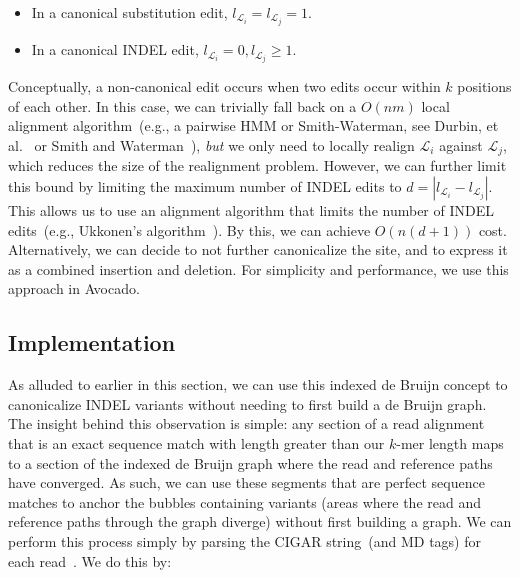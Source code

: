 \documentclass[phd]{ucbthesis}
\begin{document}
\begin{itemize}
\item In a canonical substitution edit, $l_{\mathcal{L}_i} = l_{\mathcal{L}_j} = 1$.
\item In a canonical INDEL edit, $l_{\mathcal{L}_i} = 0, l_{\mathcal{L}_j} \ge 1$.
\end{itemize}

Conceptually, a non-canonical edit occurs when two edits occur within $k$ positions of each other. In
this case, we can trivially fall back on a $O(nm)$ local alignment algorithm~(e.g., a pairwise HMM or
Smith-Waterman, see Durbin, et al.~\cite{durbin98} or Smith and Waterman~\cite{smith81}), \emph{but} we only need to locally realign
$\mathcal{L}_i$ against $\mathcal{L}_j$, which reduces the size of the realignment problem. However, we
can further limit this bound by limiting the maximum number of INDEL edits to $d = | l_{\mathcal{L}_i} -
l_{\mathcal{L}_j} |$. This allows us to use an alignment algorithm that limits the number of INDEL
edits~(e.g., Ukkonen's algorithm~\cite{ukkonen85}). By this, we can achieve $O(n(d + 1))$ cost.
Alternatively, we can decide to not further canonicalize the site, and to express it as a combined
insertion and deletion. For simplicity and performance, we use this approach in {Avocado}.

\subsection{Implementation}
\label{sec:implementation}

As alluded to earlier in this section, we can use this indexed de Bruijn concept
to canonicalize INDEL variants without needing to first build a de Bruijn graph.
The insight behind this observation is simple: any section of a read alignment
that is an exact sequence match with length greater than our $k$-mer length maps
to a section of the indexed de Bruijn graph where the read and reference paths
have converged. As such, we can use these segments that are perfect sequence
matches to anchor the bubbles containing variants (areas where the read and
reference paths through the graph diverge) without first building a graph.
We can perform this process simply by parsing the CIGAR string~(and MD tags)
for each read~\cite{li09}. We do this by:
\end{document}
